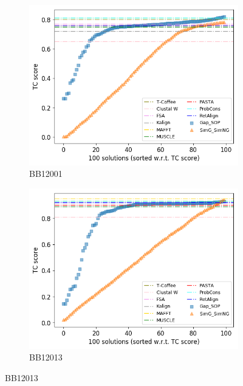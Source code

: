 \begin{figure}[!htbp]
	\centering
	\begin{adjustwidth}{-1cm}{-1cm}
		\begin{subfigure}{0.22\textwidth}
			\includegraphics[width=\columnwidth]{Figure/summary/precomputedInit/Balibase/BB12001_tc_density_single_run_2}
			\caption{BB12001}
		\end{subfigure}	
		\begin{subfigure}{0.22\textwidth}
			\includegraphics[width=\columnwidth]{Figure/summary/precomputedInit/Balibase/BB12013_tc_density_single_run_2}
			\caption{BB12013}
		\end{subfigure}

\end{adjustwidth}
\end{figure}

